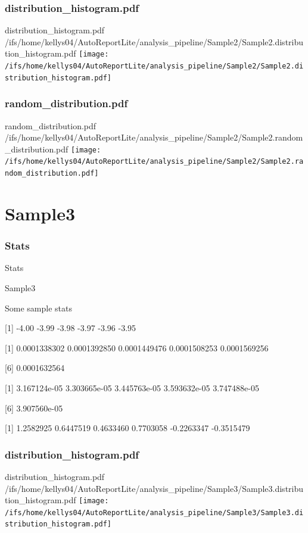 \documentclass[8pt]{beamer}\usepackage[]{graphicx}\usepackage[]{color}
\begin{document}
\subsubsection{distribution\_histogram.pdf}
\begin{frame}{distribution\_histogram.pdf }
\scriptsize{/ifs/home/kellys04/AutoReportLite/analysis\_pipeline/Sample2/Sample2.distribution\_histogram.pdf}
\texttt{[image: /ifs/home/kellys04/AutoReportLite/analysis\_pipeline/Sample2/Sample2.distribution\_histogram.pdf]}
\end{frame}

\subsubsection{random\_distribution.pdf}
\begin{frame}{random\_distribution.pdf }
\scriptsize{/ifs/home/kellys04/AutoReportLite/analysis\_pipeline/Sample2/Sample2.random\_distribution.pdf}
\texttt{[image: /ifs/home/kellys04/AutoReportLite/analysis\_pipeline/Sample2/Sample2.random\_distribution.pdf]}
\end{frame}

\section{Sample3}
\subsubsection{Stats}
\begin{frame}{Stats }
\small{
Sample3 

Some sample stats

[1] -4.00 -3.99 -3.98 -3.97 -3.96 -3.95

[1] 0.0001338302 0.0001392850 0.0001449476 0.0001508253 0.0001569256

[6] 0.0001632564

[1] 3.167124e-05 3.303665e-05 3.445763e-05 3.593632e-05 3.747488e-05

[6] 3.907560e-05

[1]  1.2582925  0.6447519  0.4633460  0.7703058 -0.2263347 -0.3515479
}

\end{frame}

\subsubsection{distribution\_histogram.pdf}
\begin{frame}{distribution\_histogram.pdf }
\scriptsize{/ifs/home/kellys04/AutoReportLite/analysis\_pipeline/Sample3/Sample3.distribution\_histogram.pdf}
\texttt{[image: /ifs/home/kellys04/AutoReportLite/analysis\_pipeline/Sample3/Sample3.distribution\_histogram.pdf]}
\end{frame}
\end{document}
